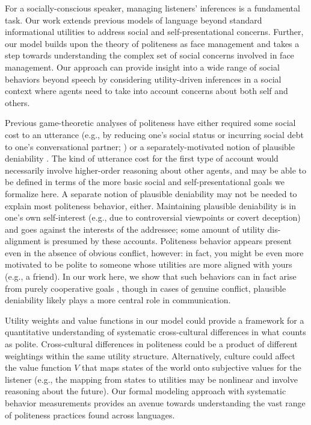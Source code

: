 \documentclass[9pt,twocolumn,twoside,lineno]{main_class_file}
\begin{document}
For a socially-conscious speaker, managing listeners' inferences is a
fundamental task. Our work extends previous models of language beyond
standard informational utilities to address social and
self-presentational concerns. Further, our model builds upon the theory of politeness as face
management \cite{brown1987} and takes a step towards
understanding the complex set of social concerns involved in face management.
Our approach can provide insight into a wide range of social behaviors beyond speech by considering utility-driven inferences in a
social context \cite{baker2017rational, hamlin2013mentalistic} where agents need to take
into account concerns about both self and others.

Previous game-theoretic analyses of politeness have either required some social cost to an utterance (e.g., by reducing one's social status or incurring social debt to one's conversational partner; \cite{vanRooy2003}) or a separately-motivated notion of plausible deniability \cite{pinker2008}.
The kind of utterance cost for the first type of account would necessarily involve higher-order reasoning about other agents, and may be able to be defined in terms of the more basic social and self-presentational goals we formalize here.
A separate notion of plausible deniability may not be needed to explain most politeness behavior, either.
Maintaining plausible deniability is in one's own self-interest (e.g., due to controversial viewpoints or covert deception) and goes against the interests of the addressee; some amount of utility dis-alignment is presumed by these accounts. Politeness behavior appears present even in the absence of obvious conflict, however: in fact, you might be even more motivated to be polite to someone whose utilities are more aligned with yours (e.g., a friend). In our work here, we show that such behaviors can in fact arise from purely cooperative goals \cite{brown1987}, though in cases of genuine conflict, plausible deniability likely plays a more central role in communication.

Utility weights and value functions in our model could provide a framework for a quantitative understanding of systematic
cross-cultural differences in what counts as polite. Cross-cultural differences in politeness could be a product of different weightings within the same
utility structure. Alternatively, culture could affect
the value function \(V\) that maps states of the world onto subjective
values for the listener (e.g., the mapping from states to utilities may
be nonlinear and involve reasoning about the future).
Our formal modeling approach with systematic behavior measurements provides an avenue towards understanding the vast range of politeness practices found across languages.
\end{document}
